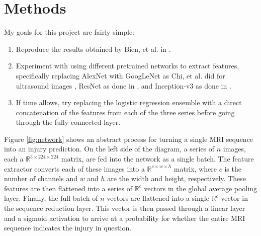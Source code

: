 \documentclass[10pt,twocolumn,letterpaper]{article}
\begin{document}
\section{Methods} %

My goals for this project are fairly simple:
\begin{enumerate}
   \item Reproduce the results obtained by Bien, et al. in \cite{bien2018deep}.
   \item Experiment with using different pretrained networks to extract features,
   specifically replacing AlexNet with GoogLeNet \cite{szegedy2015going} as Chi, et al. did for ultrasound images \cite{chi2017thyroid}, ResNet \cite{he2016deep} as done in \cite{korfiatis2017residual}, and Inception-v3 \cite{szegedy2016rethinking} as done in \cite{kim2018artificial}.
   \item If time allows, try replacing the logistic regression ensemble with a direct concatenation of the features from each of the three series before going through the fully connected layer.
\end{enumerate}

Figure \ref{fig:network} shows an abstract process for turning a single MRI sequence into an injury prediction. On the left side of the diagram, a series of $n$ images, each a $\mathbb{R}^{3 \times 224 \times 224}$ matrix, are fed into the network as a single batch. The feature extractor converts each of these images into a $\mathbb{R}^{c \times w \times h}$ matrix, where $c$ is the number of channels and $w$ and $h$ are the width and height, respectively. These features are then flattened into a series of $\mathbb{R}^c$ vectors in the global average pooling layer. Finally, the full batch of $n$ vectors are flattened into a single $\mathbb{R}^c$ vector in the sequence reduction layer. This vector is then passed through a linear layer and a sigmoid activation to arrive at a probability for whether the entire MRI sequence indicates the injury in question.
\end{document}
